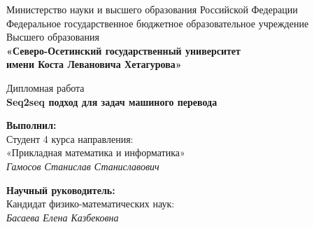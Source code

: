 \documentclass[a4paper,12pt]{article}
\begin{document}
	\setcounter{page}{0}
	\renewcommand{\labelenumii}{\arabic{enumi}.\arabic{enumii}.}
	
	
	\begin{center}
		\small{Министерство науки и высшего образования Российской Федерации}\\
		\small{Федеральное государственное бюджетное образовательное учреждение}\\
		\small{Высшего образования}\\
		\small{\textbf{«Северо-Осетинский государственный университет\\
				имени Коста Левановича Хетагурова»}}\\
		
		\hfill \break
		\hfill \break
		\hfill \break
		\hfill \break
		\hfill \break
		\hfill \break
		\hfill \break
		\hfill \break
		\hfill \break
		
		\normalsize{Дипломная работа}\\
		\large{\textbf{Seq2seq подход для задач машиного перевода}}\\
		
		\hfill \break
		\hfill \break
		\hfill \break
		\hfill \break
		\hfill \break
		\hfill\break
	\end{center}
	
	\begin{flushright}
		\textbf{Выполнил:}\\
		Студент 4 курса направления:\\
		«Прикладная математика и информатика»\\
		\textit{Гамосов Станислав Станиславович \underline{\hspace{3cm}}}\\
	\end{flushright}
	
	\hfill
	
	\begin{flushright}
		\textbf{Научный руководитель:}\\
		Кандидат физико-математических наук:\\
		\textit{Басаева Елена Казбековна \underline{\hspace{3cm}}}\\
	\end{flushright}
	
\end{document}
